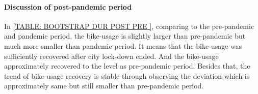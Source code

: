 \paragraph{Discussion of post-pandemic period}
In \ref{TABLE: BOOTSTRAP DUR POST PRE }, comparing to the pre-pandemic and 
pandemic period, the bike-usage is slightly larger than pre-pandemic but 
much more smaller than pandemic period. 
It means that the bike-usage was sufficiently recovered after city lock-down ended.
And the bike-usage approximately recovered to the level as pre-pandemic period.
Besides that, the trend of bike-usage recovery is stable through 
observing the deviation which is approximately same but still smaller than pre-pandemic 
period. 